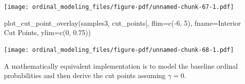 \documentclass[
  letterpaper,
  DIV=11,
  numbers=noendperiod]{scrartcl}
\newenvironment{Shaded}{\begin{snugshade}}{\end{snugshade}}
\newcommand{\AttributeTok}[1]{\textcolor[rgb]{0.40,0.45,0.13}{#1}}
\newcommand{\ControlFlowTok}[1]{\textcolor[rgb]{0.00,0.23,0.31}{#1}}
\newcommand{\DecValTok}[1]{\textcolor[rgb]{0.68,0.00,0.00}{#1}}
\newcommand{\FloatTok}[1]{\textcolor[rgb]{0.68,0.00,0.00}{#1}}
\newcommand{\FunctionTok}[1]{\textcolor[rgb]{0.28,0.35,0.67}{#1}}
\newcommand{\NormalTok}[1]{\textcolor[rgb]{0.00,0.23,0.31}{#1}}
\newcommand{\OtherTok}[1]{\textcolor[rgb]{0.00,0.23,0.31}{#1}}
\newcommand{\SpecialCharTok}[1]{\textcolor[rgb]{0.37,0.37,0.37}{#1}}
\newcommand{\StringTok}[1]{\textcolor[rgb]{0.13,0.47,0.30}{#1}}
\begin{document}
\begin{Shaded}
\end{Shaded}

\texttt{[image: ordinal\_modeling\_files/figure-pdf/unnamed-chunk-67-1.pdf]}

\begin{Shaded}
\begin{Highlighting}[]
\FunctionTok{plot\_cut\_point\_overlay}\NormalTok{(samples3, }\StringTok{\textquotesingle{}cut\_points[\textquotesingle{}}\NormalTok{,}
                       \AttributeTok{flim=}\FunctionTok{c}\NormalTok{(}\SpecialCharTok{{-}}\DecValTok{6}\NormalTok{, }\DecValTok{5}\NormalTok{), }\AttributeTok{fname=}\StringTok{\textquotesingle{}Interior Cut Points\textquotesingle{}}\NormalTok{,}
                       \AttributeTok{ylim=}\FunctionTok{c}\NormalTok{(}\DecValTok{0}\NormalTok{, }\FloatTok{0.75}\NormalTok{))}
\end{Highlighting}
\end{Shaded}

\texttt{[image: ordinal\_modeling\_files/figure-pdf/unnamed-chunk-68-1.pdf]}

A mathematically equivalent implementation is to model the baseline
ordinal probabilities and then derive the cut points assuming
\(\gamma = 0\).
\end{document}
